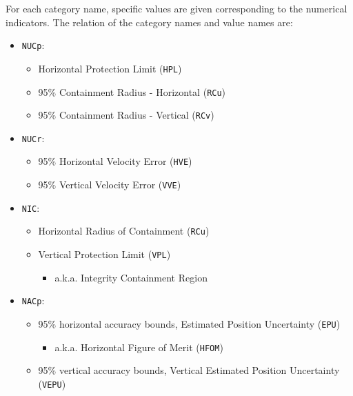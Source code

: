 For each category name, specific values are given corresponding to the
numerical indicators. The relation of the category names and value names
are:

\begin{itemize}

\item
  \texttt{NUCp}:

  \begin{itemize}

  \item
    Horizontal Protection Limit (\texttt{HPL})
  \item
    95\% Containment Radius - Horizontal (\texttt{RCu})
  \item
    95\% Containment Radius - Vertical (\texttt{RCv})
  \end{itemize}
\item
  \texttt{NUCr}:

  \begin{itemize}

  \item
    95\% Horizontal Velocity Error (\texttt{HVE})
  \item
    95\% Vertical Velocity Error (\texttt{VVE})
  \end{itemize}
\item
  \texttt{NIC}:

  \begin{itemize}

  \item
    Horizontal Radius of Containment (\texttt{RCu})
  \item
    Vertical Protection Limit (\texttt{VPL})

    \begin{itemize}

    \item
      a.k.a. Integrity Containment Region
    \end{itemize}
  \end{itemize}
\item
  \texttt{NACp}:

  \begin{itemize}

  \item
    95\% horizontal accuracy bounds, Estimated Position Uncertainty
    (\texttt{EPU})

    \begin{itemize}

    \item
      a.k.a. Horizontal Figure of Merit (\texttt{HFOM})
    \end{itemize}
  \item
    95\% vertical accuracy bounds, Vertical Estimated Position
    Uncertainty (\texttt{VEPU})


\end{itemize}
\end{itemize}
